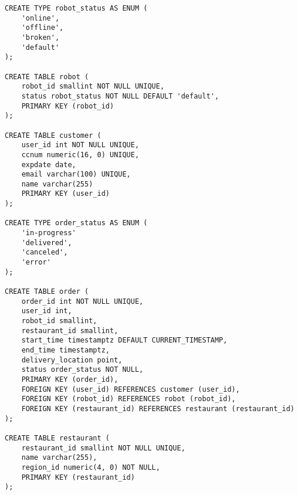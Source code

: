 \documentclass{report}
\begin{document}


\begin{lstlisting}[style=psql]
CREATE TYPE robot_status AS ENUM (
    'online',
    'offline',
    'broken',
    'default'
);

CREATE TABLE robot (
    robot_id smallint NOT NULL UNIQUE,
    status robot_status NOT NULL DEFAULT 'default',
    PRIMARY KEY (robot_id)
);

CREATE TABLE customer (
    user_id int NOT NULL UNIQUE,
    ccnum numeric(16, 0) UNIQUE,
    expdate date,
    email varchar(100) UNIQUE,
    name varchar(255)
    PRIMARY KEY (user_id)
);

CREATE TYPE order_status AS ENUM (
    'in-progress'
    'delivered',
    'canceled',
    'error'
);

CREATE TABLE order (
    order_id int NOT NULL UNIQUE,
    user_id int,
    robot_id smallint,
    restaurant_id smallint,
    start_time timestamptz DEFAULT CURRENT_TIMESTAMP,
    end_time timestamptz,
    delivery_location point,
    status order_status NOT NULL,
    PRIMARY KEY (order_id),
    FOREIGN KEY (user_id) REFERENCES customer (user_id),
    FOREIGN KEY (robot_id) REFERENCES robot (robot_id),
    FOREIGN KEY (restaurant_id) REFERENCES restaurant (restaurant_id)
);

CREATE TABLE restaurant (
    restaurant_id smallint NOT NULL UNIQUE,
    name varchar(255),
    region_id numeric(4, 0) NOT NULL,
    PRIMARY KEY (restaurant_id)
);
\end{lstlisting}
\end{document}

